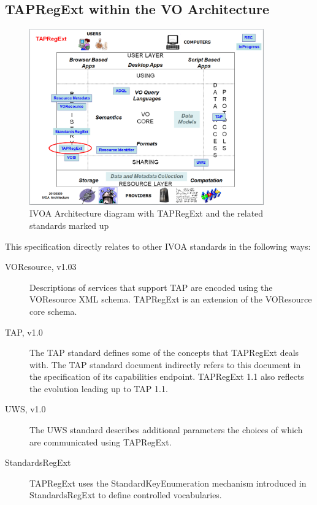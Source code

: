 \documentclass{ivoa}
\begin{document}
\subsection{TAPRegExt within the VO Architecture}

\label{architecture}

\begin{figure}[th]
\begin{center}
\includegraphics[width=0.9\textwidth]{TAPRegExt-arch.png}
\end{center}
\caption{IVOA Architecture diagram with TAPRegExt and
the related standards marked up}
\label{fig:arch}
\end{figure}

This specification directly relates to other IVOA standards in the following
ways:


\begin{description}
\item[VOResource, v1.03 \citep{std:VOR}] Descriptions of services that support TAP are encoded
using the VOResource XML schema. TAPRegExt is an extension 
of the VOResource core schema.
\item[TAP, v1.0 \citep{std:TAP}]The TAP standard defines some of the concepts that TAPRegExt
deals with. The TAP standard document indirectly
refers to this document in the specification of its capabilities endpoint.
TAPRegExt 1.1 also reflects the evolution leading up to TAP 1.1.
\item[UWS, v1.0 \citep{std:UWS}]The UWS standard describes additional parameters the choices 
of which are communicated using TAPRegExt.
\item[StandardsRegExt \citep{std:STDREGEXT}] TAPRegExt uses the StandardKeyEnumeration mechanism introduced
in StandardsRegExt to define controlled vocabularies.

\end{description}
\end{document}
